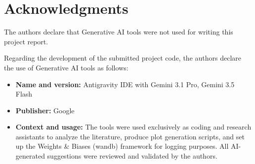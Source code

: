\section*{Acknowledgments}

\begin{center}
\begin{minipage}{0.9\columnwidth}

The authors declare that Generative AI tools were not used for writing this project report.

Regarding the development of the submitted project code, the authors declare the use of Generative AI tools as follows:

\begin{itemize}
    \item \textbf{Name and version:} Antigravity IDE with Gemini 3.1 Pro, Gemini 3.5 Flash
    \item \textbf{Publisher:} Google
    \item \textbf{Context and usage:} The tools were used exclusively as coding and research assistants to analyze the literature, 
    produce plot generation scripts, and set up the Weights \& Biases (wandb) framework for logging purposes. 
    All AI-generated suggestions were reviewed and validated by the authors.
\end{itemize}

\end{minipage}
\end{center}
